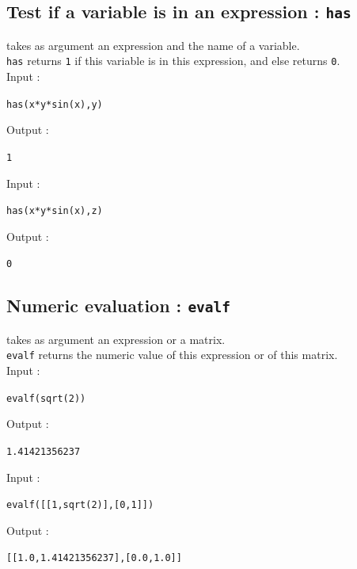 \documentclass[a4paper,11pt]{book}
\begin{document}
\subsection{Test if a variable is in an expression : {\tt has}}
 takes as argument an expression and the name of a 
variable.\\
{\tt has} returns {\tt 1} if this variable is in this expression, and else 
returns {\tt 0}.\\
Input :
\begin{center}{\tt has(x*y*sin(x),y)}\end{center}
Output :
\begin{center}{\tt  1}\end{center}
Input :
\begin{center}{\tt has(x*y*sin(x),z)}\end{center}
Output :
\begin{center}{\tt  0}\end{center}

\subsection{Numeric evaluation : {\tt evalf}}
 takes as argument an expression or a matrix.\\
{\tt evalf} returns the numeric value of this expression or of this matrix.\\
Input :
\begin{center}{\tt evalf(sqrt(2))}\end{center} 
Output :
\begin{center}{\tt 1.41421356237}\end{center}
Input :
\begin{center}{\tt evalf([[1,sqrt(2)],[0,1]])}\end{center} 
Output :
\begin{center}{\tt [[1.0,1.41421356237],[0.0,1.0]]}\end{center}
\end{document}

